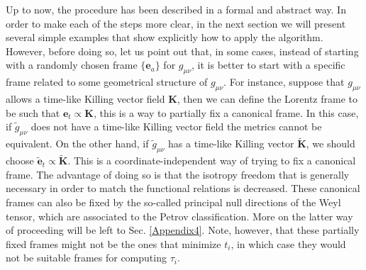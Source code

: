 \documentclass[twocolumn,prd,aps,showpacs,showkeys,amsmath,amssymb]{revtex4-1}
\newcommand{\bl}{\boldsymbol}
\begin{document}
Up to now, the procedure has been described in a formal and abstract way. In order to make each of the steps more clear, in the next section we will present several simple examples that show explicitly how to apply the algorithm. However, before doing so, let us point out that, in some cases, instead of starting with a randomly chosen frame $\{\mathbf{e}_a\}$ for $g_{\mu\nu}$, it is better to start with a specific frame related to some geometrical structure of $g_{\mu\nu}$. For instance, suppose that $g_{\mu\nu}$ allows a time-like Killing vector field $\bl{K}$, then we can define the Lorentz frame to be such that $\bl{e}_t \propto \bl{K}$, this is a way to partially fix a canonical frame. In this case, if $\tilde{g}_{\mu\nu}$ does not have a time-like Killing vector field the metrics cannot be equivalent. On the other hand, if $\tilde{g}_{\mu\nu}$ has a time-like Killing vector $\tilde{\bl{K}}$, we should choose  $\tilde{\bl{e}}_t \propto \tilde{\bl{K}}$.  This is a coordinate-independent way of trying to fix a canonical frame. The advantage of doing so is that the isotropy freedom that is generally necessary in order to match the functional relations is decreased. These canonical frames can also be fixed by the so-called principal null directions of the Weyl tensor, which are associated to the Petrov classification. More on the latter way of proceeding will be left to Sec. \ref{Appendix4}. Note, however, that these partially fixed frames might not be the ones that minimize $t_i$, in which case they would not be suitable frames for computing $\tau_i$.



\end{document}
